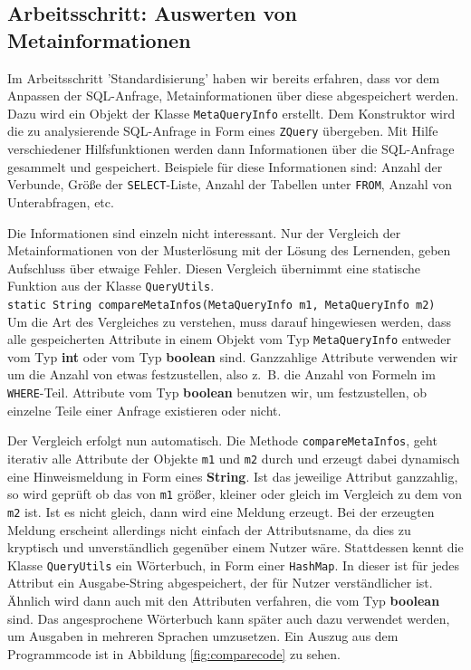 \subsection*{Arbeitsschritt: Auswerten von Metainformationen} 

Im Arbeitsschritt 'Standardisierung' haben wir bereits erfahren, dass vor dem Anpassen der SQL-Anfrage, Metainformationen über diese abgespeichert werden. Dazu wird ein Objekt der Klasse \verb|MetaQueryInfo| erstellt. Dem Konstruktor wird die zu analysierende SQL-Anfrage in Form eines \verb|ZQuery| übergeben. Mit Hilfe verschiedener Hilfsfunktionen werden dann Informationen über die SQL-Anfrage gesammelt und gespeichert. Beispiele für diese Informationen sind: Anzahl der Verbunde, Größe der \verb|SELECT|-Liste, Anzahl der Tabellen unter \verb|FROM|, Anzahl von Unterabfragen, etc.

Die Informationen sind einzeln nicht interessant. Nur der Vergleich der Metainformationen von der Musterlösung mit der Lösung des Lernenden, geben Aufschluss über etwaige Fehler. Diesen Vergleich übernimmt eine statische Funktion aus der Klasse \verb|QueryUtils|.\\
\verb|static String compareMetaInfos(MetaQueryInfo m1, MetaQueryInfo m2)|\\
Um die Art des Vergleiches zu verstehen, muss darauf hingewiesen werden, dass alle gespeicherten Attribute in einem Objekt vom Typ \verb|MetaQueryInfo| entweder vom Typ \textbf{int} oder vom Typ \textbf{boolean} sind. Ganzzahlige Attribute verwenden wir um die Anzahl von etwas festzustellen, also \mbox{z. B.} die Anzahl von Formeln im \verb|WHERE|-Teil. Attribute vom Typ \textbf{boolean} benutzen wir, um festzustellen, ob einzelne Teile einer Anfrage existieren oder nicht.

Der Vergleich erfolgt nun automatisch. Die Methode \verb|compareMetaInfos|, geht iterativ alle Attribute der Objekte \verb|m1| und \verb|m2| durch und erzeugt dabei dynamisch eine Hinweismeldung in Form eines \textbf{String}. Ist das jeweilige Attribut ganzzahlig, so wird geprüft ob das von \verb|m1| größer, kleiner oder gleich im Vergleich zu dem von \verb|m2| ist. Ist es nicht gleich, dann wird eine Meldung erzeugt. Bei der erzeugten Meldung erscheint allerdings nicht einfach der Attributsname, da dies zu kryptisch und unverständlich gegenüber einem Nutzer wäre. Stattdessen kennt die Klasse \verb|QueryUtils| ein Wörterbuch, in Form einer \verb|HashMap|. In dieser ist für jedes Attribut ein Ausgabe-String abgespeichert, der für Nutzer verständlicher ist. Ähnlich wird dann auch mit den Attributen verfahren, die vom Typ \textbf{boolean} sind. Das angesprochene Wörterbuch kann später auch dazu verwendet werden, um Ausgaben in mehreren Sprachen umzusetzen.
Ein Auszug aus dem Programmcode ist in Abbildung \ref{fig:comparecode} zu sehen.

